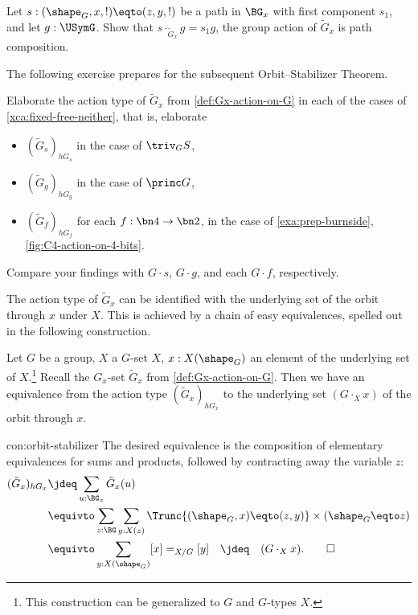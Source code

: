 \begin{xca}\label{xca:Gx-action-on-G}
Let $s:(\sh_G,x,!)\eqto(z,y,!)$ be a path in $\BG_x$ with first component
$s_1$, and let $g:\USymG$. Show that $s\cdot_{\tilde G_x} g = s_1 g$, \ie
the group action of $\tilde G_x$ is path composition. 
\end{xca}

The following exercise prepares for the subsequent Orbit--Stabilizer Theorem.

\begin{xca}\label{xca:fixed-free-neither-action-types}
Elaborate the action type of $\tilde G_x$ from \cref{def:Gx-action-on-G}
in each of the cases of \cref{xca:fixed-free-neither}, that is, elaborate
\begin{itemize}
\item $(\tilde G_s)_{hG_s}$ in the case of $\triv_G S$,
\item $(\tilde G_g)_{hG_g}$ in the case of $\princ G$, 
\item $(\tilde G_f)_{hG_f}$ for each $f:\bn4\to\bn2$,
in the case of \cref{exa:prep-burnside}, \cref{fig:C4-action-on-4-bits}.
\end{itemize}
Compare your findings with $G \cdot s$, $G \cdot g$,
and each $G \cdot f$, respectively.
\end{xca}

The action type of $\tilde G_x$ can be identified with the 
underlying set of the orbit through $x$ under $X$. This is 
achieved by a chain of easy equivalences, spelled
out in the following construction.

\begin{construction}
  \label{con:orbit-stabilizer}
  Let $G$ be a group, $X$ a $G$-set $X$,
  $x : X(\sh_G)$ an element of the underlying set of $X$.\footnote{%
  This construction can be generalized to \inftygps $G$ and $G$-types $X$.}
  Recall the $G_x$-set $\tilde G_x$ from \cref{def:Gx-action-on-G}.
  Then we have an equivalence from the action type $(\tilde G_x)_{hG_x}$
  to the underlying set $(G\cdot_X x)$ of the orbit through $x$.
\end{construction}
\begin{implementation}{con:orbit-stabilizer}
  The desired equivalence is the composition of elementary equivalences
  for sums and products, followed by contracting away the variable $z$:
  \begin{align*}
    (\tilde G_x)_{hG_x}
    &\jdeq \sum_{u : \BG_x}\tilde G_x(u) \\
    &\equivto \sum_{z:\BG}\sum_{y:X(z)}
      \Trunc{(\sh_G,x) \eqto (z,y)}\times (\sh_G \eqto z) \\
    &\equivto \sum_{y:X(\sh_G)}[x] =_{X/G} [y]\quad\jdeq\quad(G\cdot_X x).\qedhere
  \end{align*}
\end{implementation}

